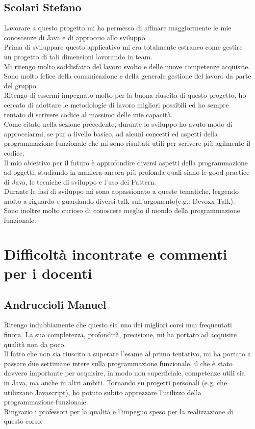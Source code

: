 \documentclass[a4paper,12pt]{report}
\begin{document}
\subsection{Scolari Stefano}
Lavorare a questo progetto mi ha permesso di affinare maggiormente le mie conoscenze di Java e di approccio allo sviluppo. 
\\
Prima di sviluppare questo applicativo mi era totalmente estraneo come gestire un progetto di tali dimensioni lavorando in team.
\\
Mi ritengo molto soddisfatto del lavoro svolto e delle nuove competenze acquisite. Sono molto felice della comunicazione e della generale gestione del lavoro da parte del gruppo.
\\
Ritengo di essermi impegnato molto per la buona riuscita di questo progetto, ho cercato di adottare le metodologie di lavoro migliori possibili ed ho sempre tentato di scrivere codice al massimo delle mie capacità.
\\
Come citato nella sezione precedente, durante lo sviluppo ho avuto modo di approcciarmi, se pur a livello basico, ad alcuni concetti ed aspetti della programmazione funzionale che mi sono risultati utili per scrivere più agilmente il codice.
\\
Il mio obiettivo per il futuro è approfondire diversi aspetti della programmazione ad oggetti, studiando in maniera ancora più profonda quali siano le good-practice di Java, le tecniche di sviluppo e l'uso dei Pattern.
\\
Durante le fasi di sviluppo mi sono appassionato a queste tematiche, leggendo molto a riguardo e guardando diversi talk sull'argomento(e.g.: Devoxx Talk).
\\
Sono inoltre molto curioso di conoscere meglio il mondo della programmazione funzionale.


\section{Difficoltà incontrate e commenti per i docenti}

\subsection{Andruccioli Manuel}

Ritengo indubbiamente che questo sia uno dei migliori corsi mai frequentati finora. La sua completezza, profondità, precisione, mi ha portato ad acquisire qualità non da poco.
\\
Il fatto che non sia riuscito a superare l'esame al primo tentativo, mi ha portato a passare due settimane intere sulla programmazione funzionale, il che è stato davvero importante per acquisire, in modo non superficiale, competenze utili sia in Java, ma anche in altri ambiti. Tornando su progetti personali (e.g. che utilizzano Javascript), ho potuto subito apprezzare l'utilizzo della programmazione funzionale.
\\
Ringrazio i professori per la qualità e l'impegno speso per la realizzazione di questo corso.
\end{document}
